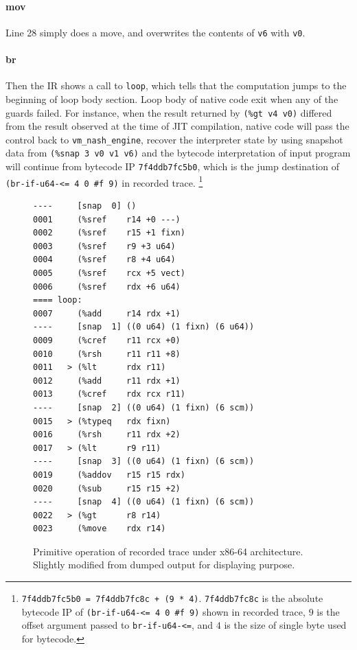\documentclass[preprint, 10pt]{sigplanconf}
\begin{document}
\paragraph{mov} Line 28 simply does a move, and overwrites the contents of
\texttt{v6} with \texttt{v0}.

\paragraph{br} Then the IR shows a call to \texttt{loop}, which tells that the
computation jumps to the beginning of loop body section. Loop body of native
code exit when any of the guards failed.  For instance, when the result
returned by \texttt{(\%gt~v4~v0)} differed from the result observed at the
time of JIT compilation, native code will pass the control back to
\texttt{vm\_nash\_engine}, recover the interpreter state by using snapshot
data from \texttt{(\%snap~3~v0~v1~v6)} and the bytecode interpretation of
input program will continue from bytecode IP \texttt{7f4ddb7fc5b0}, which is
the jump destination of \texttt{(br-if-u64-<=~4~0~\#f~9)} in recorded trace.
\footnote{ \texttt{7f4ddb7fc5b0 = 7f4ddb7fc8c + (9 * 4)}.  \texttt{7f4ddb7fc8c}
  is the absolute bytecode IP of \texttt{(br-if-u64-<= 4 0 \#f 9)} shown in
  recorded trace, $9$ is the offset argument passed to \texttt{br-if-u64-<=},
  and $4$ is the size of single byte used for bytecode.}

\begin{figure}
  \centering
  \small
\begin{verbatim}
----     [snap  0] ()
0001     (%sref    r14 +0 ---)
0002     (%sref    r15 +1 fixn)
0003     (%sref    r9 +3 u64)
0004     (%sref    r8 +4 u64)
0005     (%sref    rcx +5 vect)
0006     (%sref    rdx +6 u64)
==== loop:
0007     (%add     r14 rdx +1)
----     [snap  1] ((0 u64) (1 fixn) (6 u64))
0009     (%cref    r11 rcx +0)
0010     (%rsh     r11 r11 +8)
0011   > (%lt      rdx r11)
0012     (%add     r11 rdx +1)
0013     (%cref    rdx rcx r11)
----     [snap  2] ((0 u64) (1 fixn) (6 scm))
0015   > (%typeq   rdx fixn)
0016     (%rsh     r11 rdx +2)
0017   > (%lt      r9 r11)
----     [snap  3] ((0 u64) (1 fixn) (6 scm))
0019     (%addov   r15 r15 rdx)
0020     (%sub     r15 r15 +2)
----     [snap  4] ((0 u64) (1 fixn) (6 scm))
0022   > (%gt      r8 r14)
0023     (%move    rdx r14)
\end{verbatim}
\caption{Primitive operation of recorded trace under x86-64
  architecture. Slightly modified from dumped output for displaying purpose.}
\label{fig:primops}
\end{figure}
\end{document}
